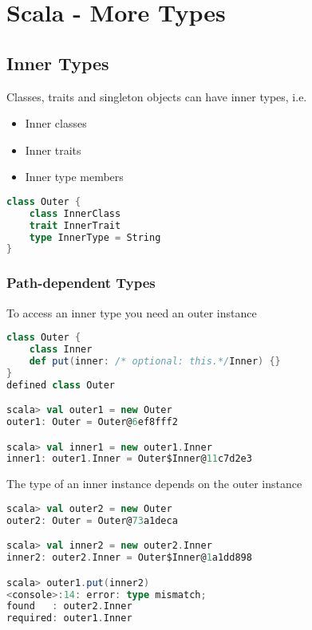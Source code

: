 \hypertarget{scala-types}{%
\section{Scala - More Types}\label{scala-types}}

\hypertarget{inner-types}{%
\subsection{Inner Types}\label{inner-types}}

Classes, traits and singleton objects can have inner types, i.e.

\begin{itemize}
\tightlist
\item
  Inner classes
\item
  Inner traits
\item
  Inner type members
\end{itemize}

\begin{lstlisting}[language=scala,mathescape=false]
class Outer {
    class InnerClass
    trait InnerTrait
    type InnerType = String
}
\end{lstlisting}

\hypertarget{path-dependent-types}{%
\subsubsection{Path-dependent Types}\label{path-dependent-types}}

To access an inner type you need an outer instance

\begin{lstlisting}[language=scala,mathescape=false]
class Outer {
    class Inner
    def put(inner: /* optional: this.*/Inner) {}
}
defined class Outer

scala> val outer1 = new Outer
outer1: Outer = Outer@6ef8fff2

scala> val inner1 = new outer1.Inner
inner1: outer1.Inner = Outer$Inner@11c7d2e3
\end{lstlisting}

The type of an inner instance depends on the outer instance

\begin{lstlisting}[language=scala,mathescape=false]
scala> val outer2 = new Outer
outer2: Outer = Outer@73a1deca

scala> val inner2 = new outer2.Inner
inner2: outer2.Inner = Outer$Inner@1a1dd898

scala> outer1.put(inner2)
<console>:14: error: type mismatch;
found   : outer2.Inner
required: outer1.Inner
\end{lstlisting}

